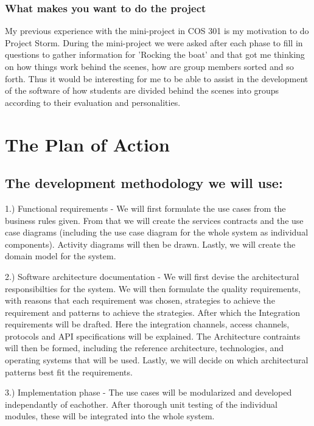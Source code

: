 \documentclass[hidelinks, 12pt, oneside]{article}
\begin{document}
\subsubsection{What makes you want to do the project}
My previous experience with the mini-project in COS 301 is my motivation to do Project Storm. During the mini-project we were asked after each phase to fill in questions to gather information for 'Rocking the boat' and that got me thinking on how things work behind the scenes, how are group members sorted and so forth. Thus it would be interesting for me to be able to assist in the development of the software of how students are divided behind the scenes into groups according to their evaluation and personalities. 

\section{The Plan of Action}

\subsection{The development methodology we will use:}

1.) Functional requirements -  We will first formulate the use cases from the business rules given. From that we will create the services contracts and the use case diagrams (including the use case diagram for the whole system as individual components). Activity diagrams will then be drawn. Lastly, we will create the domain model for the system.

2.) Software architecture documentation - We will first devise the architectural responsibilties for the system. We will then formulate the quality requirements, with reasons that each requirement was chosen, strategies to achieve the requirement and patterns to achieve the strategies. After which the Integration requirements will be drafted. Here the integration channels, access channels, protocols and API specifications will be explained. The Architecture contraints will then be formed, including the reference architecture, technologies, and operating systems that will be used. Lastly, we will decide on which architectural patterns best fit the requirements. 

3.) Implementation phase - The use cases will be modularized and developed independantly of eachother. After thorough unit testing of the individual modules, these will be integrated into the whole system. 
\end{document}
